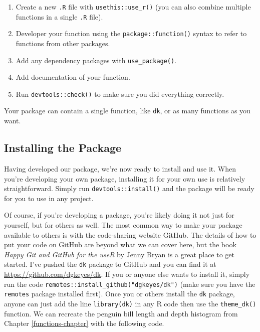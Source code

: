 \documentclass[
]{book}
\providecommand{\tightlist}{%
  \setlength{\itemsep}{0pt}\setlength{\parskip}{0pt}}
\begin{document}
\begin{enumerate}
\def\labelenumi{\arabic{enumi}.}
\tightlist
\item
  Create a new \texttt{.R} file with \texttt{usethis::use\_r()} (you can also combine multiple functions in a single \texttt{.R} file).
\item
  Developer your function using the \texttt{package::function()} syntax to refer to functions from other packages.
\item
  Add any dependency packages with \texttt{use\_package()}.
\item
  Add documentation of your function.
\item
  Run \texttt{devtools::check()} to make sure you did everything correctly.
\end{enumerate}

Your package can contain a single function, like \texttt{dk}, or as many functions as you want.

\hypertarget{installing-the-package}{%
\subsection*{Installing the Package}\label{installing-the-package}}

Having developed our package, we're now ready to install and use it. When you're developing your own package, installing it for your own use is relatively straightforward. Simply run \texttt{devtools::install()} and the package will be ready for you to use in any project.

Of course, if you're developing a package, you're likely doing it not just for yourself, but for others as well. The most common way to make your package available to others is with the code-sharing website GitHub. The details of how to put your code on GitHub are beyond what we can cover here, but the book \emph{Happy Git and GitHub for the useR} by Jenny Bryan is a great place to get started. I've pushed the \texttt{dk} package to GitHub and you can find it at \url{https://github.com/dgkeyes/dk}. If you or anyone else wants to install it, simply run the code \texttt{remotes::install\_github("dgkeyes/dk")} (make sure you have the \texttt{remotes} package installed first). Once you or others install the \texttt{dk} package, anyone can just add the line \texttt{library(dk)} in any R code then use the \texttt{theme\_dk()} function. We can recreate the penguin bill length and depth histogram from Chapter \ref{functions-chapter} with the following code.
\end{document}
